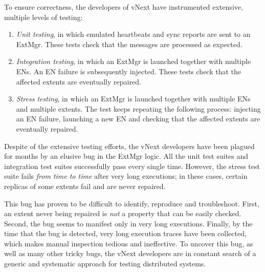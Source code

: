 To ensure correctness, the developers of vNext have instrumented extensive, multiple levels of testing:
\begin{enumerate}
\item \emph{Unit testing}, in which emulated heartbeats and sync reports are sent to an ExtMgr. These tests check that the messages are processed as expected.

\item \emph{Integration testing}, in which an ExtMgr is launched together with multiple ENs. An EN failure is subsequently injected. These tests check that the affected extents are eventually repaired.

\item \emph{Stress testing}, in which an ExtMgr is launched together with multiple ENs and multiple extents. The test keeps repeating the following process: injecting an EN failure, launching a new EN and checking that the affected extents are eventually repaired.
\end{enumerate}

\noindent
Despite of the extensive testing efforts, the vNext developers have been plagued for months by an elusive bug in the ExtMgr logic. All the unit test suites and integration test suites successfully pass every single time. However, the stress test suite fails \emph{from time to time} after very long executions; in these cases, certain replicas of some extents fail and are never repaired.

This bug has proven to be difficult to identify, reproduce and troubleshoot. First, an extent never being repaired is \emph{not} a property that can be easily checked. Second, the bug seems to manifest only in very long executions. Finally, by the time that the bug is detected, very long execution traces have been collected, which makes manual inspection tedious and ineffective. To uncover this bug, as well as many other tricky bugs, the vNext developers are in constant search of a generic and systematic approach for testing distributed systems.
